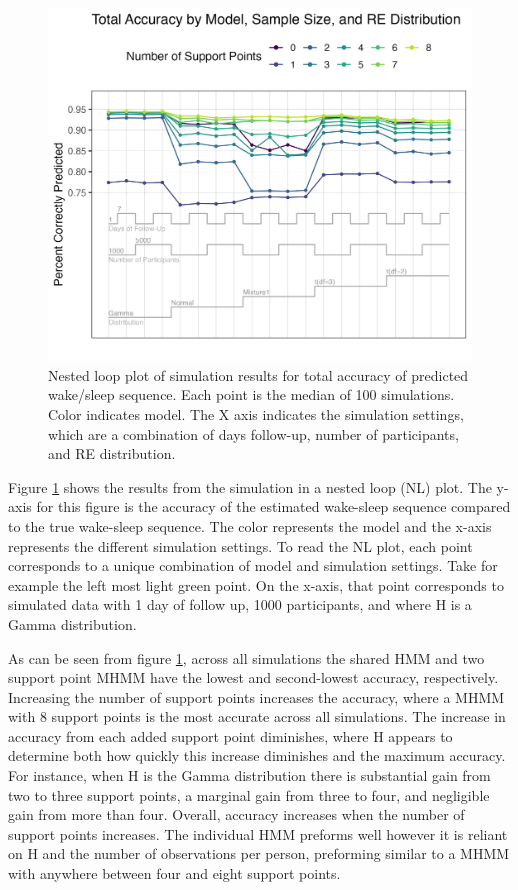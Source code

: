 \documentclass{article}
\begin{document}
\begin{figure}
    \includegraphics[scale=.8]{Support/NestedLoopAcc.png}
    \centering
    \caption{Nested loop plot of simulation results for total accuracy of predicted wake/sleep sequence. Each point is the median of 100 simulations. Color indicates model. The X axis indicates the simulation settings, which are a combination of days follow-up, number of participants, and RE distribution.}
    \label{NLacc}
\end{figure}
    
Figure \ref{NLacc} shows the results from the simulation in a nested loop (NL) plot. The y-axis for this figure is the accuracy of the estimated wake-sleep sequence compared to the true wake-sleep sequence. The color represents the model and the x-axis represents the different simulation settings. To read the NL plot, each point corresponds to a unique combination of model and simulation settings. Take for example the left most light green point. On the x-axis, that point corresponds to simulated data with 1 day of follow up, 1000 participants, and where H is a Gamma distribution.

As can be seen from figure \ref{NLacc}, across all simulations the shared HMM and two support point MHMM have the lowest and second-lowest accuracy, respectively. Increasing the number of support points increases the accuracy, where a MHMM with 8 support points is the most accurate across all simulations. The increase in accuracy from each added support point diminishes, where H appears to determine both how quickly this increase diminishes and the maximum accuracy. For instance, when H is the Gamma distribution there is substantial gain from two to three support points, a marginal gain from three to four, and negligible gain from more than four. Overall, accuracy increases when the number of support points increases. The individual HMM preforms well however it is reliant on H and the number of observations per person, preforming similar to a MHMM with anywhere between four and eight support points. 
 
\end{document}
